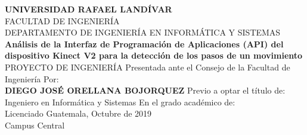 \begin{center}
{\LARGE \textbf{UNIVERSIDAD RAFAEL LAND\'IVAR}}\\[0.1cm]
{\normalsize FACULTAD DE INGENIER\'IA}\\[0.1cm]
{\normalsize DEPARTAMENTO DE INGENIER\'IA EN INFORM\'ATICA Y SISTEMAS}\\[4cm]
{\huge \textbf{An\'alisis de
la Interfaz de Programaci\'on de Aplicaciones (API) del dispositivo Kinect V2 para la detecci\'on de
los pasos de un movimiento}}\\[0.1cm]
{\LARGE PROYECTO DE INGENIER\'IA}
\vfill
{\LARGE Presentada ante el Consejo de la Facultad de Ingenier\'ia}
\vfill
{\LARGE Por:}\\[0.1cm]
{\LARGE \textbf{DIEGO JOS\'E ORELLANA BOJORQUEZ}}
\vfill
Previo a optar el t\'itulo de:\\[0.1cm]
Ingeniero en Inform\'atica y Sistemas
\vfill
En el grado acad\'emico de:\\[0.1cm]
Licenciado
\vfill
Guatemala, Octubre de 2019\\[0.1cm]
Campus Central
\end{center}